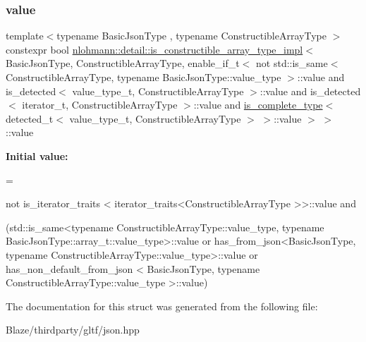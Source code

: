\subsubsection{\texorpdfstring{value}{value}}
{\footnotesize\ttfamily template$<$typename Basic\+Json\+Type , typename Constructible\+Array\+Type $>$ \\
constexpr bool \hyperlink{structnlohmann_1_1detail_1_1is__constructible__array__type__impl}{nlohmann\+::detail\+::is\+\_\+constructible\+\_\+array\+\_\+type\+\_\+impl}$<$ Basic\+Json\+Type, Constructible\+Array\+Type, enable\+\_\+if\+\_\+t$<$ not std\+::is\+\_\+same$<$ Constructible\+Array\+Type, typename Basic\+Json\+Type\+::value\+\_\+type $>$\+::value and is\+\_\+detected$<$ value\+\_\+type\+\_\+t, Constructible\+Array\+Type $>$\+::value and is\+\_\+detected$<$ iterator\+\_\+t, Constructible\+Array\+Type $>$\+::value and \hyperlink{structnlohmann_1_1detail_1_1is__complete__type}{is\+\_\+complete\+\_\+type}$<$ detected\+\_\+t$<$ value\+\_\+type\+\_\+t, Constructible\+Array\+Type $>$ $>$\+::value $>$ $>$\+::value\hspace{0.3cm}{\ttfamily [static]}}

{\bfseries Initial value\+:}
\begin{DoxyCode}
=
                
                
                
                
                not is\_iterator\_traits <
                iterator\_traits<ConstructibleArrayType >>::value and

                (std::is\_same<typename ConstructibleArrayType::value\_type, typename
       BasicJsonType::array\_t::value\_type>::value or
                    has\_from\_json<BasicJsonType,
                    \textcolor{keyword}{typename} ConstructibleArrayType::value\_type>::value or
                    has\_non\_default\_from\_json <
                    BasicJsonType, \textcolor{keyword}{typename} ConstructibleArrayType::value\_type >::value)
\end{DoxyCode}


The documentation for this struct was generated from the following file\+:\begin{DoxyCompactItemize}
\item 
Blaze/thirdparty/gltf/json.\+hpp\end{DoxyCompactItemize}
